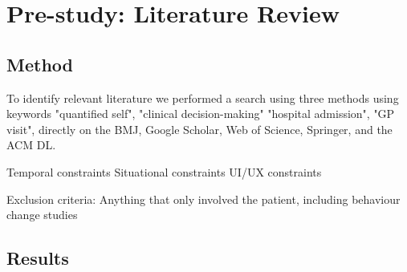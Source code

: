 \documentclass{sigchi}
\begin{document}
\section{Pre-study: Literature Review} 

\subsection{Method}
To identify relevant literature we performed a search using three methods using keywords "quantified self", "clinical decision-making" "hospital admission", "GP visit", directly on the BMJ, Google Scholar, Web of Science, Springer, and the ACM DL.

Temporal constraints
Situational constraints
UI/UX constraints 




Exclusion criteria:
  Anything that only involved the patient, including behaviour change studies

\subsection{Results}







\end{document}
